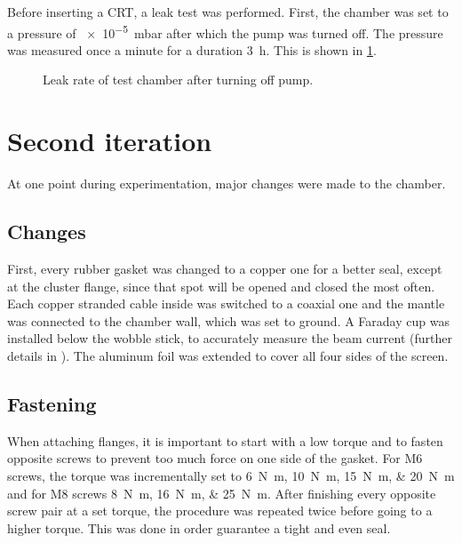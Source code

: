 Before inserting a CRT, a leak test was performed. First, the chamber was set to a pressure of \SI{e-5}{\milli\bar} after which the pump was turned off. The pressure was measured once a minute for a duration \SI{3}{\hour}. This is shown in \cref{fig:Leak rate of test chamber after turning off pump}.

\begin{figure}[ht]
	\centering
		
	\begin{tikzpicture}
		
	\end{tikzpicture}
	
	\caption{Leak rate of test chamber after turning off pump.}
	\label{fig:Leak rate of test chamber after turning off pump}
\end{figure}


\section{Second iteration}
\label{sec:Second iteration}

At one point during experimentation, major changes were made to the chamber.

\subsection{Changes}
\label{subsec:Changes}

First, every rubber gasket was changed to a copper one for a better seal, except at the cluster flange, since that spot will be opened and closed the most often. Each copper stranded cable inside was switched to a coaxial one and the mantle was connected to the chamber wall, which was set to ground. A Faraday cup was installed below the wobble stick, to accurately measure the beam current (further details in ). The aluminum foil was extended to cover all four sides of the screen.

\subsection{Fastening}
\label{subsec:Fastening}

When attaching flanges, it is important to start with a low torque and to fasten opposite screws to prevent too much force on one side of the gasket. For M6 screws, the torque was incrementally set to \SIlist{6;10;15;20}{\newton\meter} and for M8 screws \SIlist{8;16;25}{\newton\meter}. After finishing every opposite screw pair at a set torque, the procedure was repeated twice before going to a higher torque. This was done in order guarantee a tight and even seal.